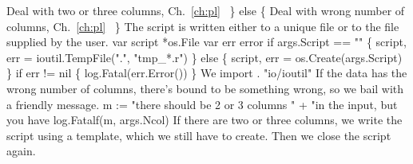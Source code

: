           \LA{}Deal with two or three columns, Ch.~\ref{ch:pl}~{\nwtagstyle{}}\RA{}
\} else \{
          \LA{}Deal with wrong number of columns, Ch.~\ref{ch:pl}~{\nwtagstyle{}}\RA{}
\}
\nwendcode{}\nwdocspar
The script is written either to a unique file or to the file supplied
by the user. 
\nwenddocs{}\endmoddef\nwstartdeflinemarkup{}\nwenddeflinemarkup
var script *os.File
var err error
if args.Script == "" \{
          script, err = ioutil.TempFile(".", "tmp_*.r")
\} else \{
          script, err = os.Create(args.Script)
\}
if err != nil \{
          log.Fatal(err.Error())
\}
\nwendcode{}\nwdocspar
We import .
\nwenddocs{}\plusendmoddef\nwstartdeflinemarkup{}\nwenddeflinemarkup
"io/ioutil"
\nwendcode{}\nwdocspar
If the data has the wrong number of columns, there's bound to be
something wrong, so we bail with a friendly message.
\nwenddocs{}\endmoddef\nwstartdeflinemarkup{}\nwenddeflinemarkup
m := "there should be 2 or 3 columns " +
          "in the input, but you have %
log.Fatalf(m, args.Ncol)
\nwendcode{}\nwdocspar
If there are two or three columns, we write the script using a
template, which we still have to create. Then we close the script
again.
\nwenddocs{}\endmoddef\nwstartdeflinemarkup{}\nwenddeflinemarkup
